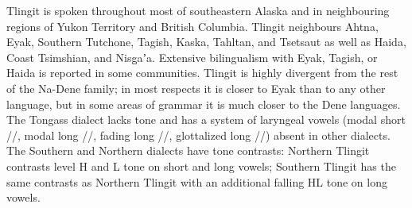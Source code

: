 \documentclass[12pt,letterpaper,oneside,article]{memoir}
\begin{document}
Tlingit is spoken throughout most of southeastern Alaska and in neighbouring regions of Yukon Territory and British Columbia.
Tlingit neighbours Ahtna, Eyak, Southern Tutchone, Tagish, Kaska, Tahltan, and Tsetsaut as well as Haida, Coast Tsimshian, and Nisg̱aʼa.
Extensive bilingualism with Eyak, Tagish, or Haida is reported in some communities.
Tlingit is highly divergent from the rest of the Na-Dene family; in most respects it is closer to Eyak than to any other language, but in some areas of grammar it is much closer to the Dene languages.
The Tongass dialect lacks tone and has a system of laryngeal vowels (modal short //, modal long //, fading long //, glottalized long //) absent in other dialects.
The Southern and Northern dialects have tone contrasts:
Northern Tlingit contrasts level H and L tone on short and long vowels;
Southern Tlingit has the same contrasts as Northern Tlingit with an additional falling HL tone on long vowels.
\end{document}
